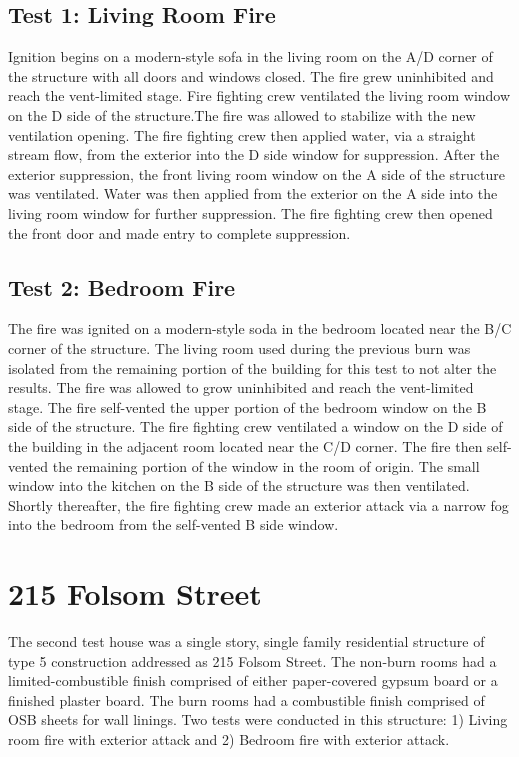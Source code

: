 \documentclass[12pt,oneside]{book}
\begin{document}
\subsection{Test 1: Living Room Fire}

Ignition begins on a modern-style sofa in the living room on the A/D corner of the structure with all doors and windows closed. The fire grew uninhibited and reach the vent-limited stage. Fire fighting crew ventilated the living room window on the D side of the structure.The fire was allowed to stabilize with the new ventilation opening. The fire fighting crew then applied water, via a straight stream flow, from the exterior into the D side window for suppression. After the exterior suppression, the front living room window on the A side of the structure was ventilated. Water was then applied from the exterior on the A side into the living room window for further suppression. The fire fighting crew then opened the front door and made entry to complete suppression.

\subsection{Test 2: Bedroom Fire}

The fire was ignited on a modern-style soda in the bedroom located near the B/C corner of the structure. The living room used during the previous burn was isolated from the remaining portion of the building for this test to not alter the results. The fire was allowed to grow uninhibited and reach the vent-limited stage. The fire self-vented the upper portion of the bedroom window on the B side of the structure. The fire fighting crew ventilated a window on the D side of the building in the adjacent room located near the C/D corner. The fire then self-vented the remaining portion of the window in the room of origin. The small window into the kitchen on the B side of the structure was then ventilated. Shortly thereafter, the fire fighting crew made an exterior attack via a narrow fog into the bedroom from the self-vented B side window.

\section{215 Folsom Street}

The second test house was a single story, single family residential structure of type 5 construction addressed as 215 Folsom Street. The non-burn rooms had a limited-combustible finish comprised of either paper-covered gypsum board or a finished plaster board. The burn rooms had a combustible finish comprised of OSB sheets for wall linings. Two tests were conducted in this structure: 1) Living room fire with exterior attack and 2) Bedroom fire with exterior attack.
\end{document}
